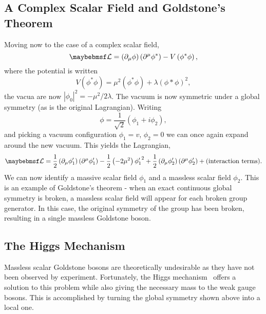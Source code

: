 \subsection{A Complex Scalar Field and Goldstone's Theorem}
\label{sec:sm_goldstone}
Moving now to the case of a complex scalar field,
\begin{equation*}
\lagrangiand = \left(\partial_{\mu}\phi\right)\left(\partial^{\mu}\phi^*\right)
- V\left(\phi^*\phi\right),
\end{equation*}
where the potential is written
\begin{equation*}
V\left(\phi^*\phi\right) = \mu^2\left(\phi^*\phi\right) +
\lambda\left(\phi*\phi\right)^2,
\end{equation*}
the vacua are now $\left|\phi_0\right|^2 = -\mu^2/2\lambda$. The vacuum is now
symmetric under a global \Uone symmetry (as is the original Lagrangian). Writing
\begin{equation*}
\phi = \frac{1}{\sqrt{2}}\left(\phi_1 + i\phi_2\right),
\end{equation*}
and picking a vacuum configuration $\phi_1 = v$, $\phi_2 = 0$ we can once again
expand around the new vacuum. This yields the Lagrangian,
\begin{equation*}
  \lagrangiand =
  \frac{1}{2}\left(\partial_{\mu}\phi'_1\right)\left(\partial^{\mu}\phi'_1\right)
  -\frac{1}{2}\left(-2\mu^2\right){\phi'_1}^2 +
  \frac{1}{2}\left(\partial_{\mu}\phi'_2\right)\left(\partial^{\mu}\phi'_2\right)
  + \textrm{(interaction terms)}.
\end{equation*}
We can now identify a massive scalar field $\phi_1$ and a massless scalar field
$\phi_2$. This is an example of Goldstone's theorem - when an exact continuous
global symmetry is broken, a massless scalar field will appear for each broken
group generator. In this case, the original \Uone symmetry of the group has been
broken, resulting in a single massless Goldstone boson.

\subsection{The Higgs Mechanism}
\label{sec:sm_higgs}
Massless scalar Goldstone bosons are theoretically undesirable as they have not
been observed by experiment. Fortunately, the Higgs mechanism~\cite{higgs} offers
a solution to this problem while also giving the necessary mass to the weak
gauge bosons. This is accomplished by turning the global symmetry shown above
into a local one.

